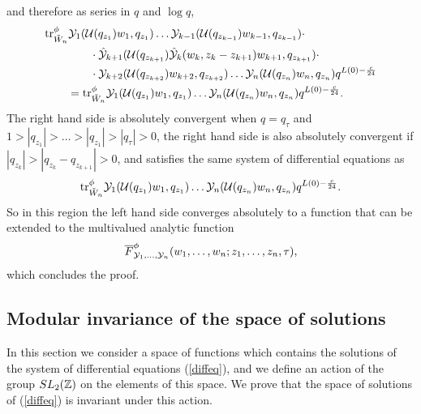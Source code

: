 \documentclass[12pt]{article}
\begin{document}
  and therefore as series in $q$ and $\log q$,
  \begin{align*}
    &\mbox{\rm tr}^\phi_{\tilde W_n}\mathcal{Y}_{1}(\mathcal{U}(q_{z_{1}})w_{1}, q_{z_{1}})\ldots \mathcal{Y}_{k-1}(\mathcal{U}(q_{z_{k-1}})w_{k-1}, q_{z_{k-1}})\cdot\\
    & \qquad \qquad \cdot
      \hat {\mathcal{Y}}_{k+1}(\mathcal{U}(q_{z_{k+1}})
      \hat {\mathcal{Y}}_k(w_k, z_k - z_{k+1})w_{k+1}, q_{z_{k+1}})\cdot\\
    &\qquad\qquad \cdot  \mathcal{Y}_{k+2}(\mathcal{U}(q_{z_{k+2}})w_{k+2}, q_{z_{k+2}})\ldots \mathcal{Y}_{n}(\mathcal{U}(q_{z_{n}})w_{n}, q_{z_{n}})q^{L(0)-\frac{c}{24}}\\
    &\qquad = \mbox{\rm tr}^\phi_{\tilde W_n} \mathcal{Y}_{1}(\mathcal{U}(q_{z_{1}})w_{1}, q_{z_{1}})\ldots \mathcal{Y}_{n}(\mathcal{U}(q_{z_{n}})w_{n}, q_{z_{n}})q^{L(0) - \frac{c}{24}}. 
  \end{align*}
  The right hand side is absolutely convergent when $q = q_\tau$ and
  $1>|q_{z_1}| > \ldots > |q_{z_1}| > |q_\tau| > 0$, the right hand side is
  also absolutely convergent if $|q_{z_{k}}| > |q_{z_{k}} - q_{z_{k+1}}| > 0$,
  and satisfies the same system of differential equations as
  $$
    \mbox{\rm tr}^\phi_{\tilde W_n} \mathcal{Y}_{1}(\mathcal{U}(q_{z_{1}})w_{1}, q_{z_{1}})\ldots \mathcal{Y}_{n}(\mathcal{U}(q_{z_{n}})w_{n}, q_{z_{n}})q^{L(0) - \frac{c}{24}}.
  $$
  So in this region the left hand side converges absolutely to a
  function that can be extended to the multivalued analytic function
  $$
    \overline F^\phi_{\mathcal{Y}_1,\ldots,\mathcal{Y}_n}(w_1,\ldots, w_n; z_1,\ldots, z_n, \tau),
  $$
  which concludes the proof.
\epfv

\subsection{Modular invariance of the space of solutions}
\label{s-diffeq-m-inv}

In this section we consider a space of functions which contains the solutions
of the system of differential equations (\ref{diffeq}), and we define an
action of the group $SL_2(\mathbb{Z})$ on the elements of this space. We prove
that the space of solutions of (\ref{diffeq}) is invariant under
this action.
\end{document}
